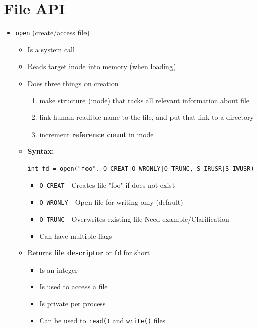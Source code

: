 \documentclass[12pt]{article}
\begin{document}
\section{File API}
\begin{itemize}
    \item \texttt{open} (create/access file)
    \begin{itemize}
        \item Is a system call
        \item Reads target inode into memory (when loading)
        \item Does three things on creation

        \begin{enumerate}[1)]
            \item make structure (inode) that racks all relevant information about file
            \item link human readible name to the file, and put that link to a directory
            \item increment \textbf{reference count} in inode
        \end{enumerate}

        \item \textbf{Syntax:}

        \bigskip

        \texttt{int fd = open("foo". O\_CREAT|O\_WRONLY|O\_TRUNC, S\_IRUSR|S\_IWUSR)}

        \bigskip

        \begin{itemize}
            \item \texttt{O\_CREAT} - Creates file "foo" if does not exist
            \item \texttt{O\_WRONLY} - Open file for writing only (default)
            \item \texttt{O\_TRUNC} - Overwrites existing file \color{red}Need example/Clarification\color{black}
            \item Can have multiple flags
        \end{itemize}
        \item Returns \textbf{file descriptor} or \texttt{fd} for short

        \begin{itemize}
            \item Is an integer
            \item Is used to access a file
            \item Is \underline{private} per process
            \item Can be used to \texttt{read()} and \texttt{write()} files
        \end{itemize}


\end{itemize}
\end{itemize}
\end{document}
